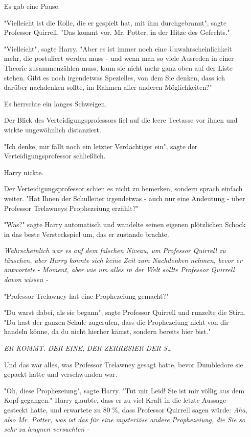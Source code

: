 {Es gab eine Pause.

"Vielleicht ist die Rolle, die er gespielt hat, mit ihm durchgebrannt", sagte Professor Quirrell. "Das kommt vor, Mr. Potter, in der Hitze des Gefechts."

"Vielleicht", sagte Harry. "Aber es ist immer noch eine Unwahrscheinlichkeit mehr, die postuliert werden muss - und wenn man so viele Ausreden in einer Theorie zusammenzählen muss, kann sie nicht mehr ganz oben auf der Liste stehen. Gibt es noch irgendetwas Spezielles, von dem Sie denken, dass ich darüber nachdenken sollte, im Rahmen aller anderen Möglichkeiten?"

Es herrschte ein langes Schweigen.

Der Blick des Verteidigungsprofessors fiel auf die leere Teetasse vor ihnen und wirkte ungewöhnlich distanziert.

"Ich denke, mir fällt noch ein letzter Verdächtiger ein", sagte der Verteidigungsprofessor schließlich.

Harry nickte.

Der Verteidigungsprofessor schien es nicht zu bemerken, sondern sprach einfach weiter. "Hat Ihnen der Schulleiter irgendetwas - auch nur eine Andeutung - über Professor Trelawneys Prophezeiung erzählt?"

"Was?" sagte Harry automatisch und wandelte seinen eigenen plötzlichen Schock in das beste Versteckspiel um, das er zustande brachte.

\emph{Wahrscheinlich war es auf dem falschen Niveau, um Professor Quirrell zu täuschen, aber Harry konnte sich keine Zeit zum Nachdenken nehmen, bevor er antwortete} - \emph{Moment, aber wie um alles in der Welt sollte Professor Quirrell davon wissen -}

"Professor Trelawney hat eine Prophezeiung gemacht?"

"Du warst dabei, als sie begann", sagte Professor Quirrell und runzelte die Stirn. "Du hast der ganzen Schule zugerufen, dass die Prophezeiung nicht von dir handeln könne, da du nicht hierher kämst, sondern bereits hier bist."

\emph{ER KOMMT. DER EINE; DER ZERRESIER DER S…-}

Und das war alles, was Professor Trelawney gesagt hatte, bevor Dumbledore sie gepackt hatte und verschwunden war.

"Oh, diese Prophezeiung", sagte Harry. "Tut mir Leid! Sie ist mir völlig aus dem Kopf gegangen." Harry glaubte, dass er zu viel Kraft in die letzte Aussage gesteckt hatte, und erwartete zu 80 \%, dass Professor Quirrell sagen würde: \emph{Aha, also Mr. Potter, was ist das für eine mysteriöse andere Prophezeiung, die Sie so sehr zu leugnen versuchten -}

}
